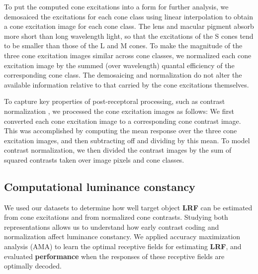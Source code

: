 \documentclass{jov}
\providecommand{\DIFaddtex}[1]{{\bf #1}} %
\providecommand{\DIFdeltex}[1]{} %
\providecommand{\DIFaddbegin}{} %
\providecommand{\DIFaddend}{} %
\providecommand{\DIFdelbegin}{} %
\providecommand{\DIFdelend}{} %
\providecommand{\DIFadd}[1]{\texorpdfstring{\DIFaddtex{#1}}{#1}} %
\providecommand{\DIFdel}[1]{\texorpdfstring{\DIFdeltex{#1}}{}} %
\newcommand{\DIFscaledelfig}{0.5}
\newlength{\DIFdelgraphicswidth} %
\newlength{\DIFdelgraphicsheight} %
\newcommand{\DIFaddincludegraphics}[2][]{{\color{blue}\fbox{\DIFOincludegraphics[#1]{#2}}}} %
\newcommand{\DIFdelincludegraphics}[2][]{%
\sbox{\DIFdelgraphicsbox}{\DIFOincludegraphics[#1]{#2}}%
\settoboxwidth{\DIFdelgraphicswidth}{\DIFdelgraphicsbox} %
\settoboxtotalheight{\DIFdelgraphicsheight}{\DIFdelgraphicsbox} %
\scalebox{\DIFscaledelfig}{%
\parbox[b]{\DIFdelgraphicswidth}{\usebox{\DIFdelgraphicsbox}\\[-\baselineskip] \rule{\DIFdelgraphicswidth}{0em}}\llap{\resizebox{\DIFdelgraphicswidth}{\DIFdelgraphicsheight}{%
\setlength{\unitlength}{\DIFdelgraphicswidth}%
\begin{picture}(1,1)%
\thicklines\linethickness{2pt} %
{\color[rgb]{1,0,0}\put(0,0){\framebox(1,1){}}}%
{\color[rgb]{1,0,0}\put(0,0){\line( 1,1){1}}}%
{\color[rgb]{1,0,0}\put(0,1){\line(1,-1){1}}}%
\end{picture}%
}\hspace*{3pt}}} %
} %
\DeclareRobustCommand{\DIFaddbegin}{\DIFOaddbegin \let\includegraphics\DIFaddincludegraphics} %
\DeclareRobustCommand{\DIFaddend}{\DIFOaddend \let\includegraphics\DIFOincludegraphics} %
\DeclareRobustCommand{\DIFdelbegin}{\DIFOdelbegin \let\includegraphics\DIFdelincludegraphics} %
\DeclareRobustCommand{\DIFdelend}{\DIFOaddend \let\includegraphics\DIFOincludegraphics} %
\begin{document}
To put the computed cone excitations into a form for further analysis, we demosaiced the excitations for each cone class using linear interpolation
to obtain a cone excitation image for each cone class.
The lens and macular pigment absorb more short than long wavelength light, so that the excitations of the S cones tend to be
smaller than those of the L and M cones.
To make the magnitude of the three cone excitation images similar across cone classes, we
normalized each cone excitation image by the summed (over wavelength) quantal efficiency of the corresponding cone class.
The demosaicing and normalization do not alter the available information relative to that carried by the cone excitations themselves. 

To capture key properties of post-receptoral processing, such as contrast normalization \cite{heeger1992normalization,albrecht1991motion,carandini2012normalization}, 
we processed the cone excitation images as follows:
We first converted each cone excitation image to a corresponding cone contrast image.
This was accomplished by computing the mean response over the three cone excitation images, and then subtracting off and dividing by this mean.
To model contrast normalization, we then divided the contrast images by the sum of squared contrasts taken over image pixels and cone classes.

\subsection{Computational luminance constancy} \label{method:SupervisedLearning}
We used our datasets to determine how well target object \DIFdelbegin \DIFdel{LRV }\DIFdelend \DIFaddbegin \DIFadd{LRF }\DIFaddend can be estimated from cone excitations and from normalized cone contrasts.
Studying both representations allows us to understand how early contrast coding and normalization affect luminance constancy.
We applied accuracy maximization analysis (AMA) to learn the optimal receptive fields for estimating \DIFdelbegin \DIFdel{LRV}\DIFdelend \DIFaddbegin \DIFadd{LRF}\DIFaddend ,
and evaluated \DIFdelbegin \DIFdel{the performance obtained }\DIFdelend \DIFaddbegin \DIFadd{performance }\DIFaddend when the responses of these receptive fields are optimally decoded.
\end{document}
